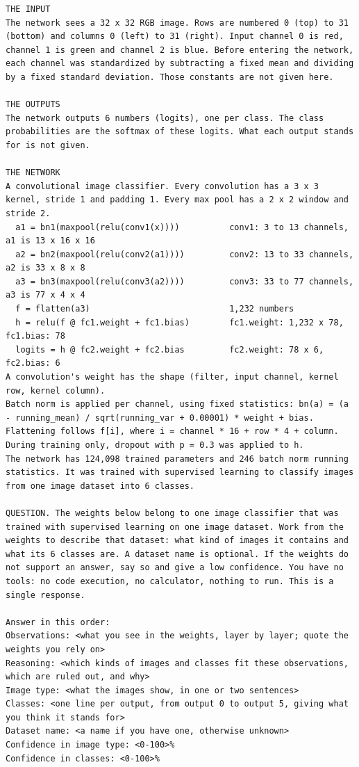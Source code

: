 \documentclass[11pt]{article}
\begin{document}
\begin{lstlisting}[caption={The revised prompt. The placeholder weight blocks are filled with the network's values when the prompt is built.},label={lst:revised}]
THE INPUT
The network sees a 32 x 32 RGB image. Rows are numbered 0 (top) to 31 (bottom) and columns 0 (left) to 31 (right). Input channel 0 is red, channel 1 is green and channel 2 is blue. Before entering the network, each channel was standardized by subtracting a fixed mean and dividing by a fixed standard deviation. Those constants are not given here.

THE OUTPUTS
The network outputs 6 numbers (logits), one per class. The class probabilities are the softmax of these logits. What each output stands for is not given.

THE NETWORK
A convolutional image classifier. Every convolution has a 3 x 3 kernel, stride 1 and padding 1. Every max pool has a 2 x 2 window and stride 2.
  a1 = bn1(maxpool(relu(conv1(x))))          conv1: 3 to 13 channels, a1 is 13 x 16 x 16
  a2 = bn2(maxpool(relu(conv2(a1))))         conv2: 13 to 33 channels, a2 is 33 x 8 x 8
  a3 = bn3(maxpool(relu(conv3(a2))))         conv3: 33 to 77 channels, a3 is 77 x 4 x 4
  f = flatten(a3)                            1,232 numbers
  h = relu(f @ fc1.weight + fc1.bias)        fc1.weight: 1,232 x 78, fc1.bias: 78
  logits = h @ fc2.weight + fc2.bias         fc2.weight: 78 x 6, fc2.bias: 6
A convolution's weight has the shape (filter, input channel, kernel row, kernel column).
Batch norm is applied per channel, using fixed statistics: bn(a) = (a - running_mean) / sqrt(running_var + 0.00001) * weight + bias.
Flattening follows f[i], where i = channel * 16 + row * 4 + column.
During training only, dropout with p = 0.3 was applied to h.
The network has 124,098 trained parameters and 246 batch norm running statistics. It was trained with supervised learning to classify images from one image dataset into 6 classes.

QUESTION. The weights below belong to one image classifier that was trained with supervised learning on one image dataset. Work from the weights to describe that dataset: what kind of images it contains and what its 6 classes are. A dataset name is optional. If the weights do not support an answer, say so and give a low confidence. You have no tools: no code execution, no calculator, nothing to run. This is a single response.

Answer in this order:
Observations: <what you see in the weights, layer by layer; quote the weights you rely on>
Reasoning: <which kinds of images and classes fit these observations, which are ruled out, and why>
Image type: <what the images show, in one or two sentences>
Classes: <one line per output, from output 0 to output 5, giving what you think it stands for>
Dataset name: <a name if you have one, otherwise unknown>
Confidence in image type: <0-100>%
Confidence in classes: <0-100>%


\end{lstlisting}
\end{document}
